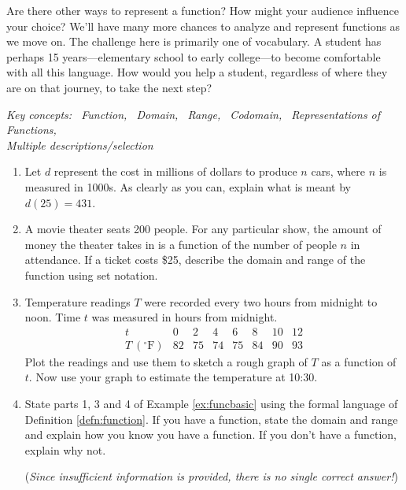 Are there other ways to represent a function? How might your audience influence your choice? We'll have many more chances to analyze and represent functions as we move on. The challenge here is primarily one of vocabulary. A student has perhaps 15 years---elementary school to early college---to become comfortable with all this language. How would you help a student, regardless of where they are on that journey, to take the next step?  


\begin{exercises}{}{}
	\emph{Key concepts: \ Function, \ Domain, \ Range, \ Codomain, \ Representations of Functions,}\\
	\hspace*{\leftmargini}\emph{Multiple descriptions/selection}
	
	\begin{enumerate}
	  \item Let $d$ represent the cost in millions of dollars to produce $n$ cars, where $n$ is measured in 1000s. As clearly as you can, explain what is meant by $d(25)=431$.
	  
	  
	  \item A movie theater seats 200 people. For any particular show, the amount of money the theater takes in is a function of the number of people $n$ in attendance. If a ticket costs \$25, describe the domain and range of the function using set notation.
	  
	  
		\item\label{exs:templinear} Temperature readings $T$ were recorded every two hours from midnight to noon. Time $t$ was measured in hours from midnight.
	  \[
	  	\begin{array}{l|ccccccc}
	  		t&0&2&4&6&8&10&12\\\hline
	  		T\ (^\circ\mathrm{F})&82&75&74&75&84&90&93
	  	\end{array}
	  \]
	  Plot the readings and use them to sketch a rough graph of $T$ as a function of $t$. Now use your graph to estimate the temperature at 10:30\AM.
	  
	  
	  \item State parts 1, 3 and 4 of Example \ref{ex:funcbasic} using the formal language of Definition \ref{defn:function}. If you have a function, state the domain and range and explain how you know you have a function. If you don't have a function, explain why not.
	  \par
	  (\emph{Since insufficient information is provided, there is no single correct answer!})
	  

\end{enumerate}
\end{exercises}
